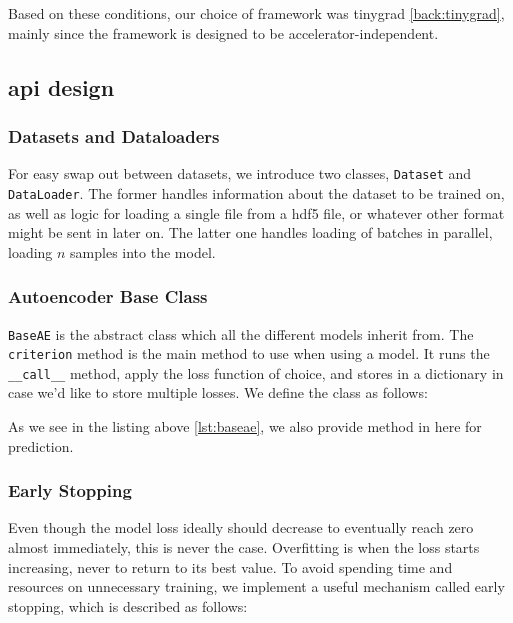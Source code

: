 Based on these conditions, our choice of framework was tinygrad \ref{back:tinygrad}, mainly since the framework is designed to be accelerator-independent.

\subsection{\acrshort{api} design}

\subsubsection{Datasets and Dataloaders}

For easy swap out between datasets, we introduce two classes, \texttt{Dataset} and \texttt{DataLoader}. The former handles information about the dataset to be trained on, as well as logic for loading a single file from a \acrshort{hdf5} file, or whatever other format might be sent in later on. The latter one handles loading of batches in parallel, loading $n$ samples into the model.

\subsubsection{Autoencoder Base Class}

\lstinline{BaseAE} is the abstract class which all the different models inherit from. The \lstinline{criterion} method is the main method to use when using a model. It runs the \lstinline{__call__} method, apply the loss function of choice, and stores in a dictionary in case we'd like to store multiple losses. We define the class as follows:



As we see in the listing above \ref{lst:baseae}, we also provide method in here for prediction. 

\subsubsection{Early Stopping}

Even though the model loss ideally should decrease to eventually reach zero almost immediately, this is never the case. Overfitting is when the loss starts increasing, never to return to its best value. To avoid spending time and resources on unnecessary training, we implement a useful mechanism called early stopping, which is described as follows:


